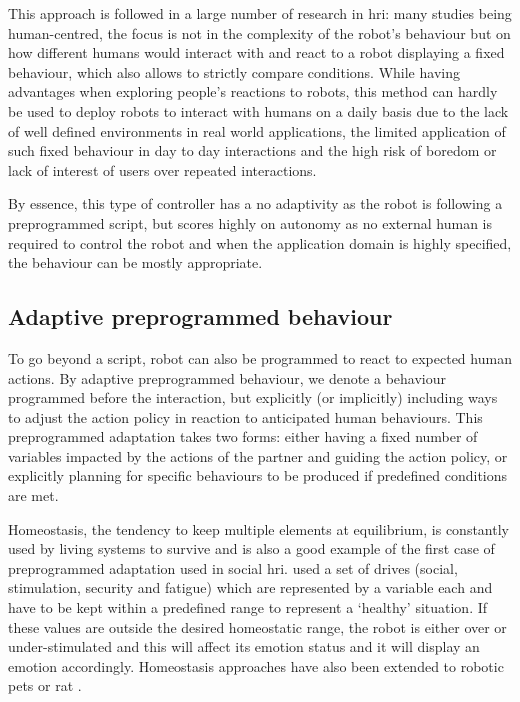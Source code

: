     This approach is followed in a large number of research in \gls{hri}: many studies being human-centred, the focus is not in the complexity of the robot's behaviour but on how different humans would interact with and react to a robot displaying a fixed behaviour, which also allows to strictly compare conditions. While having advantages when exploring people's reactions to robots, this method can hardly be used to deploy robots to interact with humans on a daily basis due to the lack of well defined environments in real world applications, the limited application of such fixed behaviour in day to day interactions and the high risk of boredom or lack of interest of users over repeated interactions.

    By essence, this type of controller has a no adaptivity as the robot is following a preprogrammed script, but scores highly on autonomy as no external human is required to control the robot and when the application domain is highly specified, the behaviour can be mostly appropriate.

\subsection{Adaptive preprogrammed behaviour}
	
	To go beyond a script, robot can also be programmed to react to expected human actions. By adaptive preprogrammed behaviour, we denote a behaviour programmed before the interaction, but explicitly (or implicitly) including ways to adjust the action policy in reaction to anticipated human behaviours. This preprogrammed adaptation takes two forms: either having a fixed number of variables impacted by the actions of the partner and guiding the action policy, or explicitly planning for specific behaviours to be produced if predefined conditions are met.
	
	
	Homeostasis, the tendency to keep multiple elements at equilibrium, is constantly used by living systems to survive and is also a good example of the first case of preprogrammed adaptation used in social \gls{hri}. \citet{breazeal1998motivational} used a set of drives (social, stimulation, security and fatigue) which are represented by a variable each and have to be kept within a predefined range to represent a `healthy' situation. If these values are outside the desired homeostatic range, the robot is either over or under-stimulated and this will affect its emotion status and it will display an emotion accordingly. Homeostasis approaches have also been extended to robotic pets \citep{arkin2003ethological} or \gls{rat} \citep{cao2017collaborative}.
	
